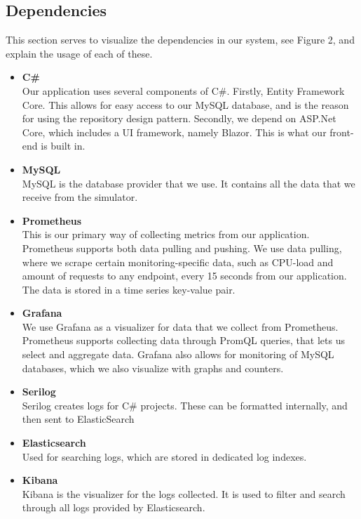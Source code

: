 \documentclass{article}
\begin{document}
\subsection{Dependencies}
This section serves to visualize the dependencies in our system, see Figure 2, and explain the usage of each of these.

\begin{itemize}
	\item \textbf{C\#\\}
	Our application uses several components of C\#. Firstly, Entity Framework Core. This allows for easy access to our MySQL database, and is the reason for using the repository design pattern. Secondly, we depend on ASP.Net Core, which includes a UI framework, namely Blazor. This is what our front-end is built in.
	\item \textbf{MySQL\\}
	MySQL is the database provider that we use. It contains all the data that we receive from the simulator.
	\item \textbf{Prometheus}\\
	This is our primary way of collecting metrics from our application. Prometheus supports both data pulling and pushing. We use data pulling, where we scrape certain monitoring-specific data, such as CPU-load and amount of requests to any endpoint, every 15 seconds from our application. The data is stored in a time series key-value pair.
	
 	\item \textbf{Grafana\\}
 	We use Grafana as a visualizer for data that we collect from Prometheus. Prometheus supports collecting data through PromQL queries, that lets us select and aggregate data. Grafana also allows for monitoring of MySQL databases, which we also visualize with graphs and counters.
 	
 	\item \textbf{Serilog}\\
 	Serilog creates logs for C\# projects. These can be formatted internally, and then sent to ElasticSearch
 	\item \textbf{Elasticsearch}\\
 	Used for searching logs, which are stored in dedicated log indexes.
 	\item \textbf{Kibana}\\
 	Kibana is the visualizer for the logs collected. It is used to filter and search through all logs provided by Elasticsearch.
 	

\end{itemize}
\end{document}

